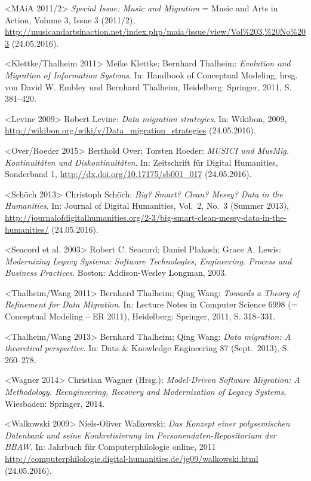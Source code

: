 \documentclass[a4paper,
fontsize=11pt,
oneside,
numbers=noperiodatend,
parskip=half-,
bibliography=totoc,
final
]{scrartcl}
\begin{document}
\textless{}MAiA 2011/2\textgreater{} \emph{Special Issue: Music and
Migration} = Music and Arts in Action, Volume 3, Issue 3 (2011/2),
\url{http://musicandartsinaction.net/index.php/maia/issue/view/Vol\%203,\%20No\%203}
(24.05.2016).

\textless{}Klettke/Thalheim 2011\textgreater{} Meike Klettke; Bernhard
Thalheim: \emph{Evolution and Migration of Information Systems}. In:
Handbook of Conceptual Modeling, hrsg. von David W. Embley und Bernhard
Thalheim, Heidelberg: Springer, 2011, S. 381--420.

\textless{}Levine 2009\textgreater{} Robert Levine: \emph{Data migration
strategies}. In: Wikibon, 2009,
\url{http://wikibon.org/wiki/v/Data_migration_strategies} (24.05.2016).

\textless{}Over/Roeder 2015\textgreater{} Berthold Over; Torsten Roeder:
\emph{MUSICI und MusMig. Kontinuitäten und Diskontinuitäten}. In:
Zeitschrift für Digital Humanities, Sonderband 1,
\url{http://dx.doi.org/10.17175/sb001_017} (24.05.2016).

\textless{}Schöch 2013\textgreater{} Christoph Schöch: \emph{Big? Smart?
Clean? Messy? Data in the Humanities}. In: Journal of Digital
Humanities, Vol.~2, No.~3 (Summer 2013),
\url{http://journalofdigitalhumanities.org/2-3/big-smart-clean-messy-data-in-the-humanities/}
(24.05.2016).

\textless{}Seacord et al. 2003\textgreater{} Robert C. Seacord; Daniel
Plakosh; Grace A. Lewis: \emph{Modernizing Legacy Systems: Software
Technologies, Engineering. Process and Business Practices}. Boston:
Addison-Wesley Longman, 2003.

\textless{}Thalheim/Wang 2011\textgreater{} Bernhard Thalheim; Qing
Wang: \emph{Towards a Theory of Refinement for Data Migration}. In:
Lecture Notes in Computer Science 6998 (= Conceptual Modeling -- ER
2011), Heidelberg: Springer, 2011, S. 318--331.

\textless{}Thalheim/Wang 2013\textgreater{} Bernhard Thalheim; Qing
Wang: \emph{Data migration: A theoretical perspective}. In: Data \&
Knowledge Engineering 87 (Sept.~2013), S. 260--278.

\textless{}Wagner 2014\textgreater{} Christian Wagner (Hrsg.):
\emph{Model-Driven Software Migration: A Methodology. Reengineering,
Recovery and Modernization of Legacy Systems}, Wiesbaden: Springer,
2014.

\textless{}Walkowski 2009\textgreater{} Niels-Oliver Walkowski:
\emph{Das Konzept einer polysemischen Datenbank und seine
Konkretisierung im Personendaten-Repositorium der BBAW}. In: Jahrbuch
für Computerphilologie online, 2011
\url{http://computerphilologie.digital-humanities.de/jg09/walkowski.html}
(24.05.2016).

\end{document}

